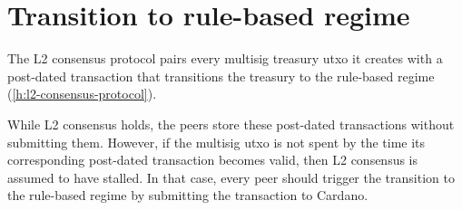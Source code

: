 \documentclass[../hydrozoa.tex]{subfiles}
\begin{document}
\section{Transition to rule-based regime}%
\label{h:l1-rule-based-transition}%

The L2 consensus protocol pairs every multisig treasury utxo it creates with a post-dated transaction that transitions the treasury to the rule-based regime (\cref{h:l2-consensus-protocol}).

While L2 consensus holds, the peers store these post-dated transactions without submitting them.
However, if the multisig utxo is not spent by the time its corresponding post-dated transaction becomes valid, then L2 consensus is assumed to have stalled.
In that case, every peer should trigger the transition to the rule-based regime by submitting the transaction to Cardano.
\end{document}
